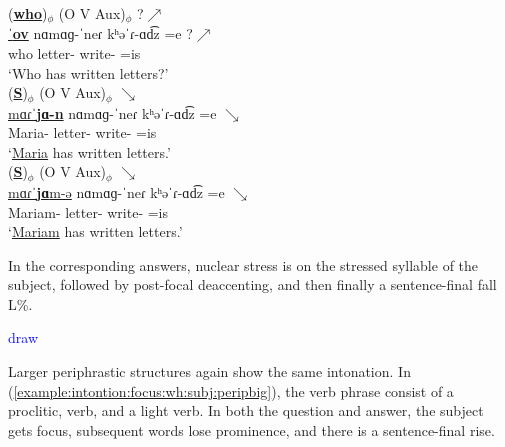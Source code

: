 \begin{exe}
	\ex \label{example:intontion:focus:wh:subj:perip} \begin{xlist}
		
		
		\ex \glll(\underline{\textbf{who}})$_\phi$ ({O} V Aux)$_\phi$ ?$\nearrow$ \\
		\underline{ˈ\textbf{ov}} nɑmɑɡ-ˈneɾ kʰəˈɾ-ɑd͡z =e ?$\nearrow$ \\
		who letter-{\pl} write-{\rptcp} =is\\ 
		\trans `Who has written letters?'
		\label{example:intontion:focus:wh:subj:perip:q}
		\\ 
		\ex \glll (\underline{\textbf{S}})$_\phi$ ({O} V Aux)$_\phi$ $\searrow$ \\
		\underline{mɑɾˈ\textbf{jɑ-n}}  nɑmɑɡ-ˈneɾ kʰəˈɾ-ɑd͡z =e $\searrow$ \\
		Maria-{} letter-{\pl} write-{\rptcp} =is\\ 
		\trans `\underline{Maria}  has written letters.' 
		\\  
		\ex \glll (\underline{\textbf{S}})$_\phi$ ({O} V Aux)$_\phi$  $\searrow$ \\
		\underline{mɑɾˈ\textbf{jɑ}m-ə} nɑmɑɡ-ˈneɾ kʰəˈɾ-ɑd͡z  =e $\searrow$ \\
		Mariam-{} letter-{\pl} write-{\rptcp} =is\\ 
		\trans `\underline{Mariam}     has written letters.' 
		\\  
		
		
	\end{xlist}
\end{exe}

In the corresponding answers, nuclear stress is on the stressed syllable of the subject, followed by post-focal deaccenting, and then finally a sentence-final fall L\%. 

\textcolor{blue}{draw}

Larger periphrastic structures again show the same intonation. In (\ref{example:intontion:focus:wh:subj:peripbig}), the verb phrase consist of a proclitic, verb, and a light verb. In both the question and answer, the subject gets focus, subsequent words lose prominence, and there is a sentence-final rise. 



